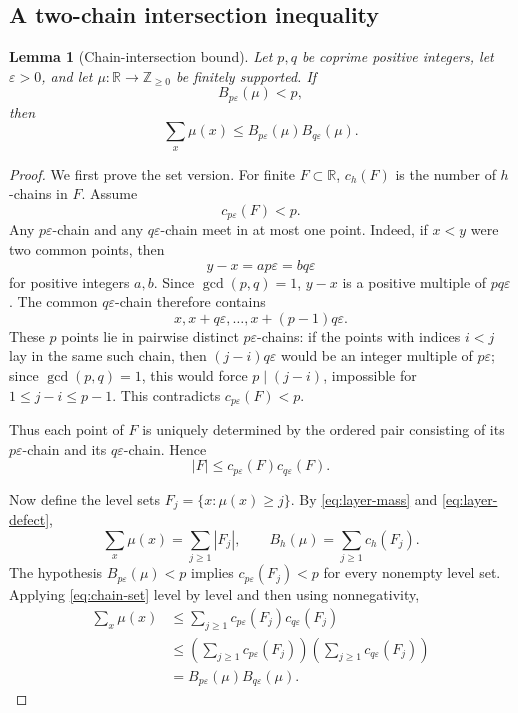\documentclass[11pt]{article}
\newtheorem{lemma}[theorem]{Lemma}
\theoremstyle{definition}
\newcommand{\R}{\mathbb{R}}
\newcommand{\Z}{\mathbb{Z}}
\newcommand{\1}{\mathbf{1}}
\begin{document}
\subsection{A two-chain intersection inequality}

\begin{lemma}[Chain-intersection bound]\label{lem:chain-intersection}
Let $p,q$ be coprime positive integers, let $\varepsilon>0$, and let $\mu:\R\to\Z_{\ge0}$ be finitely supported.  If
\[
  B_{p\varepsilon}(\mu)<p,
\]
then
\begin{equation}\label{eq:chain-mu}
  \sum_x\mu(x)
  \le B_{p\varepsilon}(\mu)B_{q\varepsilon}(\mu).
\end{equation}
\end{lemma}

\begin{proof}
We first prove the set version.  For finite $F\subset\R$, $c_h(F)$ is the number of $h$-chains in $F$.  Assume
\[
  c_{p\varepsilon}(F)<p.
\]
Any $p\varepsilon$-chain and any $q\varepsilon$-chain meet in at most one point.  Indeed, if $x<y$ were two common points, then
\[
  y-x=ap\varepsilon=bq\varepsilon
\]
for positive integers $a,b$.  Since $\gcd(p,q)=1$, $y-x$ is a positive multiple of $pq\varepsilon$.  The common $q\varepsilon$-chain therefore contains
\[
  x,x+q\varepsilon,\ldots,x+(p-1)q\varepsilon.
\]
These $p$ points lie in pairwise distinct $p\varepsilon$-chains: if the points with indices $i<j$ lay in the same such chain, then $(j-i)q\varepsilon$ would be an integer multiple of $p\varepsilon$; since $\gcd(p,q)=1$, this would force $p\mid(j-i)$, impossible for $1\le j-i\le p-1$.  This contradicts $c_{p\varepsilon}(F)<p$.

Thus each point of $F$ is uniquely determined by the ordered pair consisting of its $p\varepsilon$-chain and its $q\varepsilon$-chain.  Hence
\begin{equation}\label{eq:chain-set}
  |F|\le c_{p\varepsilon}(F)c_{q\varepsilon}(F).
\end{equation}

Now define the level sets $F_j=\{x:\mu(x)\ge j\}$.  By \eqref{eq:layer-mass} and \eqref{eq:layer-defect},
\[
  \sum_x\mu(x)=\sum_{j\ge1}|F_j|,
  \qquad
  B_h(\mu)=\sum_{j\ge1}c_h(F_j).
\]
The hypothesis $B_{p\varepsilon}(\mu)<p$ implies $c_{p\varepsilon}(F_j)<p$ for every nonempty level set.  Applying \eqref{eq:chain-set} level by level and then using nonnegativity,
\begin{align*}
  \sum_x\mu(x)
  &\le\sum_{j\ge1}c_{p\varepsilon}(F_j)c_{q\varepsilon}(F_j)\\
  &\le\left(\sum_{j\ge1}c_{p\varepsilon}(F_j)\right)
       \left(\sum_{j\ge1}c_{q\varepsilon}(F_j)\right)\\
  &=B_{p\varepsilon}(\mu)B_{q\varepsilon}(\mu).
\end{align*}
\end{proof}
\end{document}
